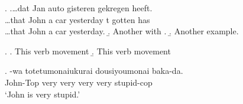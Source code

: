 \documentclass{article}
\begin{document}
\ex. 
\ag.\ldots dat Jan  auto gisteren   gekregen heeft.\\
\ldots that John a car  yesterday t gotten has \\
\ldots that John a car yesterday.
\b. Another  with .
\b. Another example.

\ex.
\a. This  verb movement 
\b. This  verb movement 

\exg.
-wa totetumonaiukurai dousiyoumonai     baka-da.\\
 John-Top very very very very {} stupid-cop \\
 `John is very stupid.'  
 
\end{document}
